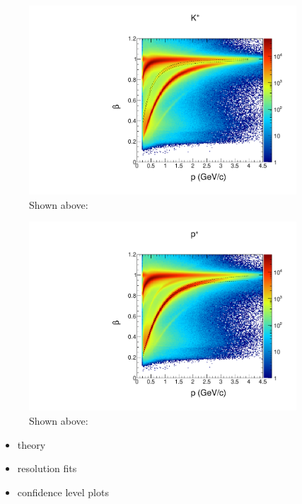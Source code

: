 \begin{figure}
  \begin{center}
    \includegraphics[width=10cm]{image/beautiful_pbeta_kp.pdf}
    \caption{ Shown above: }
  \end{center}
\end{figure}

\begin{figure}
  \begin{center}
    \includegraphics[width=10cm]{image/beautiful_pbeta_prot.pdf}
    \caption{ Shown above: }
  \end{center}
\end{figure}

\begin{itemize}
  \item theory 
  \item resolution fits 
  \item confidence level plots
\end{itemize}



